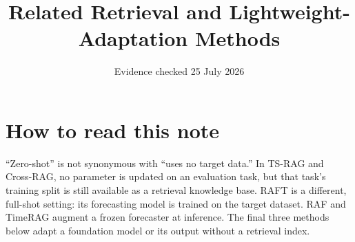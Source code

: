 \documentclass[10pt]{article}
\title{Related Retrieval and Lightweight-Adaptation Methods}
\author{}
\date{Evidence checked 25 July 2026}
\begin{document}
\maketitle

\section{How to read this note}
``Zero-shot'' is not synonymous with ``uses no target data.''  In TS-RAG and
Cross-RAG, no parameter is updated on an evaluation task, but that task's
training split is still available as a retrieval knowledge base.  RAFT is a
different, full-shot setting: its forecasting model is trained on the target
dataset.  RAF and TimeRAG augment a frozen forecaster at inference.  The final
three methods below adapt a foundation model or its output without a retrieval
index.
\end{document}
